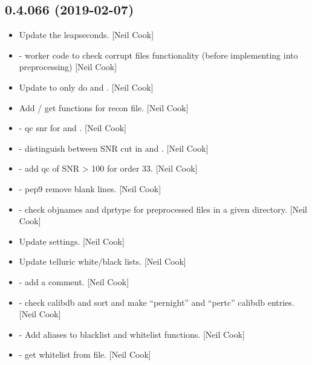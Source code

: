 \documentclass[a4paper,10pt,english]{report}
\begin{document}
\subsection{0.4.066 (2019-02-07)}
\label{\detokenize{misc/changelog:id191}}\begin{itemize}
\item {} 
Update the leapseconds. {[}Neil Cook{]}

\item {} 
 - worker code to check corrupt files
functionality (before implementing into preprocessing) {[}Neil Cook{]}

\item {} 
Update to only do  and . {[}Neil Cook{]}

\item {} 
Add  / get functions for recon file. {[}Neil Cook{]}

\item {} 
 - qc snr for  and . {[}Neil
Cook{]}

\item {} 
 - distinguish between SNR cut in  and
. {[}Neil Cook{]}

\item {} 
 - add qc of SNR \textgreater{} 100 for order 33. {[}Neil Cook{]}

\item {} 
 - pep9 remove blank lines. {[}Neil Cook{]}

\item {} 
 - check objnames and dprtype for preprocessed files
in a given directory. {[}Neil Cook{]}

\item {} 
Update  settings. {[}Neil Cook{]}

\item {} 
Update telluric white/black lists. {[}Neil Cook{]}

\item {} 
 - add a comment. {[}Neil Cook{]}

\item {} 
 - check calibdb and sort and make “pernight” and
“pertc” calibdb entries. {[}Neil Cook{]}

\item {} 
 - Add aliases to blacklist and whitelist
functions. {[}Neil Cook{]}

\item {} 
 - get whitelist from file. {[}Neil Cook{]}

\end{itemize}
\end{document}
